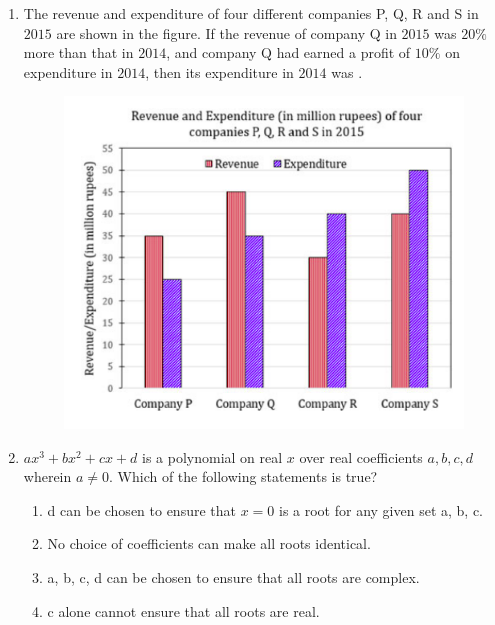 \documentclass[journal,12pt,onecolumn]{IEEEtran}
\theoremstyle{remark}
\begin{document}
\begin{enumerate}[start=1, label=Q.\arabic*]
\hfill{}

\item The revenue and expenditure of four different companies P, Q, R and S in $2015$ are shown in the figure. If the revenue of company Q in $2015$ was $20\%$ more than that in $2014$, and company Q had earned a profit of $10\%$ on expenditure in $2014$, then its expenditure  in $2014$ was \underline{\hspace{2cm}}.
\begin{figure}[H]
    \centering
    \includegraphics[width=0.6\columnwidth]{Figures/aq10.png}
    \caption{}
\end{figure}
    \begin{enumerate}
    \end{enumerate}

\hfill{}

\item $ax^{3}+bx^{2}+cx+d$ is a polynomial on real $x$ over real coefficients $a, b, c, d$ wherein $a \ne 0$. Which of the following statements is true?
    \begin{enumerate}
        \item d can be chosen to ensure that $x=0$ is a root for any given set a, b, c.
        \item No choice of coefficients can make all roots identical.
        \item a, b, c, d can be chosen to ensure that all roots are complex.
        \item c alone cannot ensure that all roots are real.
    \end{enumerate}


\end{enumerate}
\end{document}
